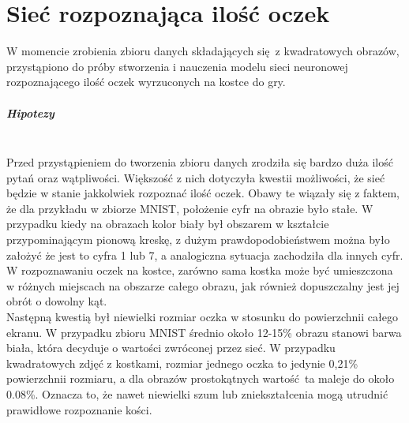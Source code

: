 
\chapter{Sieć rozpoznająca ilość oczek}

W momencie zrobienia zbioru danych składających się z kwadratowych obrazów, przystąpiono
do próby stworzenia i nauczenia modelu sieci neuronowej rozpoznającego ilość oczek
wyrzuconych na kostce do gry. \\

\paragraph{Hipotezy} \mbox{}\\
Przed przystąpieniem do tworzenia zbioru danych zrodziła się bardzo duża ilość pytań
oraz wątpliwości. Większość z nich dotyczyła kwestii możliwości, że sieć będzie w stanie
jakkolwiek rozpoznać ilość oczek. Obawy te wiązały się z faktem, że dla przykładu
w zbiorze MNIST, położenie cyfr na obrazie było stałe. W przypadku kiedy na obrazach
kolor biały był obszarem w kształcie przypominającym pionową kreskę, z dużym
prawdopodobieństwem można było założyć że jest to cyfra 1 lub 7, a analogiczna
sytuacja zachodziła dla innych cyfr. W rozpoznawaniu oczek na kostce, zarówno sama
kostka może być umieszczona w różnych miejscach na obszarze całego obrazu, jak również
dopuszczalny jest jej obrót o dowolny kąt. \\
Następną kwestią był niewielki rozmiar oczka w stosunku do powierzchnii całego ekranu.
W przypadku zbioru MNIST średnio około 12-15\% obrazu stanowi barwa biała, która
decyduje o wartości zwróconej przez sieć. W przypadku kwadratowych zdjęć z kostkami,
rozmiar jednego oczka to jedynie 0,21\% powierzchnii rozmiaru, a dla obrazów prostokątnych
wartość ta maleje do około 0.08\%. Oznacza to, że nawet niewielki szum lub
zniekształcenia mogą utrudnić prawidłowe rozpoznanie kości. \\


